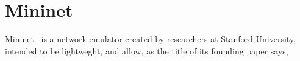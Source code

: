 \section{Mininet}
\label{sec:exemulmininet}

Mininet~\cite{mininetnetworklaptop} is a network emulator created by researchers at Stanford University, intended to be lightweght, and allow, as the title of its founding paper says, 

